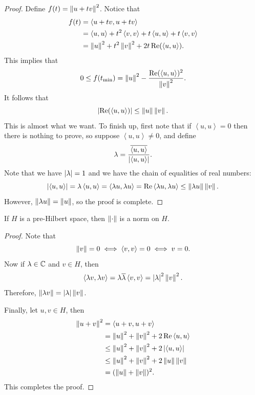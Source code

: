 \documentclass[a4paper]{article}
\renewcommand{\braket}[2]{\left\langle #1, #1 \right\rangle}
\begin{document}
\begin{proof}
  Define $f(t) = \left\lVert u + tv\right\rVert^2$. Notice that
  \[
    \begin{aligned}
      f(t)
       & = \braket{u + tv}{u + tv}                              \\
       & = \braket{u}{u}
      + t^2 \braket{v}{v} + t \braket{u}{v} + t \braket{v}{u}   \\
       & = \norm{u}^2 + t^2 \norm{v}^2 + 2t \Re(\braket{u}{v}).
    \end{aligned}
  \]
  This implies that
  \[
    0 \leq f(t_{\text{min}}) = \norm{u}^2 -
    \frac{\Re(\braket{u}{v})^2}{\norm{v}^2}.
  \]
  It follows that
  \[
    \abs{\Re( \braket{u}{v} )} \leq \norm{u} \norm{v}.
  \]
  This is almost what we want.
  To finish up, first note that if
  $\braket{u}{v} = 0$ then there is nothing to prove,
  so suppose $\braket{u}{v} \neq 0$,
  and define
  \[
    \lambda = \frac{\bar{\braket{u}{v}}}{\abs{\braket{u}{v}}}.
  \]
  Note that we have $\left\lvert \lambda\right\rvert = 1$ and we have
  the chain of equalities of real numbers:
  \[
    \abs{\braket{u}{v}} = \lambda \braket{u}{v}
    = \braket{\lambda u}{v} = \Re \braket{\lambda u}{v}
    \leq \norm{\lambda u} \norm{v}.
  \]
  However, $\left\lVert \lambda u\right\rVert = \left\lVert u\right\rVert$, so the proof is
  complete.

\end{proof}

\begin{thm}
  If $H$ is a pre-Hilbert space, then $\left\lVert \cdot\right\rVert$
  is a norm on $H$.
\end{thm}

\begin{proof}
  Note that
  \[
    \norm{v} = 0 \iff \braket{v}{v} = 0 \iff v = 0.
  \]
  Now if $\lambda \in \mathbb{C}$ and $v \in H$, then
  \[
    \braket{\lambda v}{\lambda v} = \lambda \bar{\lambda}
    \braket{v}{v} = \abs{\lambda}^2 \norm{v}^2.
  \]
  Therefore, $\left\lVert \lambda v\right\rVert = \left\lvert \lambda\right\rvert \left\lVert v\right\rVert$.

  Finally, let $u, v \in H$, then
  \[
    \begin{aligned}
      \norm{u + v}^2
       & = \braket{u + v}{u + v}                              \\
       & = \norm{u}^2 + \norm{v}^2 + 2 \Re \braket{u}{v}      \\
       & \leq \norm{u}^2 + \norm{v}^2 + 2 \abs{\braket{u}{v}} \\
       & \leq \norm{u}^2 + \norm{v}^2 + 2 \norm{u} \norm{v}   \\
       & = (\norm{u} + \norm{v})^2.
    \end{aligned}
  \]
  This completes the proof.
\end{proof}
\end{document}
